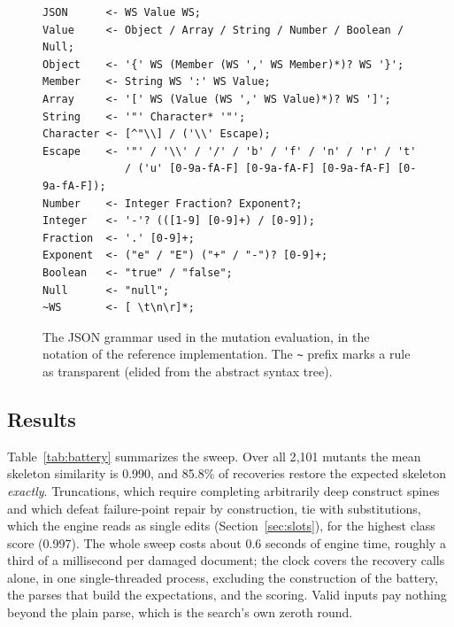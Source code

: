 \documentclass[manuscript]{acmart}
\newcommand{\cd}[1]{\texttt{#1}}
\begin{document}
\begin{figure}[tbp]
\begin{lstlisting}[numbers=none,basicstyle=\scriptsize\ttfamily]
JSON      <- WS Value WS;
Value     <- Object / Array / String / Number / Boolean / Null;
Object    <- '{' WS (Member (WS ',' WS Member)*)? WS '}';
Member    <- String WS ':' WS Value;
Array     <- '[' WS (Value (WS ',' WS Value)*)? WS ']';
String    <- '"' Character* '"';
Character <- [^"\\] / ('\\' Escape);
Escape    <- '"' / '\\' / '/' / 'b' / 'f' / 'n' / 'r' / 't'
             / ('u' [0-9a-fA-F] [0-9a-fA-F] [0-9a-fA-F] [0-9a-fA-F]);
Number    <- Integer Fraction? Exponent?;
Integer   <- '-'? (([1-9] [0-9]+) / [0-9]);
Fraction  <- '.' [0-9]+;
Exponent  <- ("e" / "E") ("+" / "-")? [0-9]+;
Boolean   <- "true" / "false";
Null      <- "null";
~WS       <- [ \t\n\r]*;
\end{lstlisting}
\caption{\label{fig:JsonGrammar}The JSON grammar used in the mutation evaluation, in the notation of the reference implementation. The \cd{\~{}} prefix marks a rule as transparent (elided from the abstract syntax tree).}
\end{figure}

\subsection{Results}
\label{sec:results}

Table~\ref{tab:battery} summarizes the sweep. Over all 2{,}101 mutants the mean skeleton similarity is 0.990, and 85.8\% of recoveries restore the expected skeleton \emph{exactly}. Truncations, which require completing arbitrarily deep construct spines and which defeat failure-point repair by construction, tie with substitutions, which the engine reads as single edits (Section~\ref{sec:slots}), for the highest class score (0.997). The whole sweep costs about 0.6 seconds of engine time, roughly a third of a millisecond per damaged document; the clock covers the recovery calls alone, in one single-threaded process, excluding the construction of the battery, the parses that build the expectations, and the scoring. Valid inputs pay nothing beyond the plain parse, which is the search's own zeroth round.
\end{document}
